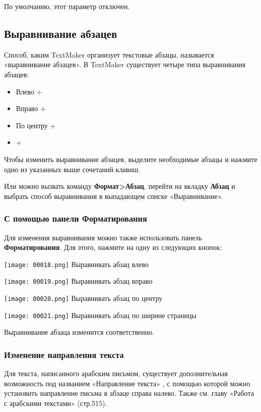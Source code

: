 \documentclass[a4paper,10pt]{article}
\begin{document}
 По умолчанию, этот параметр отключен.
 
 \subsection{Выравнивание абзацев}
 Способ, каким TextMaker организует текстовые абзацы, называется «выравнивание абзацев». В TextMaker существует четыре типа выравнивания абзацев:
 \begin{itemize}
  \item Влево +
  \item Вправо +
  \item По центру +
  \item {}+
 \end{itemize}

Чтобы изменить выравнивание абзацев, выделите необходимые абзацы и нажмите одно из указанных выше сочетаний клавиш.

Или можно вызвать команду \textbf{Формат>Абзац}, перейти на вкладку \textbf{Абзац} и выбрать способ выравнивания в выпадающем списке «Выравнивание».

\subsubsection{С помощью панели Форматирования}
Для изменения выравнивания можно также использовать панель \textbf{Форматирования}. Для этого, нажмите на одну из следующих кнопок:

\texttt{[image: 00018.png]} Выравнивать абзац влево

\texttt{[image: 00019.png]} Выравнивать абзац вправо

\texttt{[image: 00020.png]} Выравнивать абзац по центру

\texttt{[image: 00021.png]} Выравнивать абзац по ширине страницы

Выравнивание абзаца изменится соответственно.

\subsubsection{Изменение направления текста}

Для текста, написанного арабским письмом, существует дополнительная возможность под названием «Направление текста» , с помощью которой можно установить направление письма в абзаце справа налево. Также см. главу «Работа с арабскими текстами» (стр.515).
\end{document}
